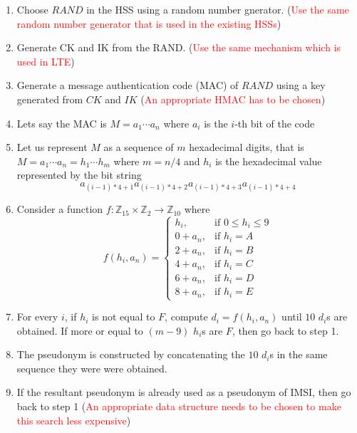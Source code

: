 \documentclass[12pt]{article}
\begin{document}
    \begin{enumerate}
    \item Choose $RAND$ in the HSS using a random number gnerator. (\textcolor{red}{Use the same random number generator that is used in the existing HSSs})
    \item Generate CK and IK from the RAND. (\textcolor{red}{Use the same mechanism which is used in LTE})
    \item Generate a message authentication code (MAC) of $RAND$ using a key generated from $CK$ and $IK$  (\textcolor{red}{An appropriate HMAC has to be chosen})
    \item Lets say the MAC is $M = a_1 \cdots a_n$ where $a_i$ is the $i$-th bit of the code
    \item Let us represent $M$ as a sequence of $m$ hexadecimal digits, that is $M = a_1 \cdots a_n = h_1 \cdots h_{m}$ where $m = n/4$ and $h_{i}$ is the hexadecimal value represented by the bit string $$a_{(i-1)*4+1}a_{(i-1)*4+2}a_{(i-1)*4+3}a_{(i-1)*4+4}$$ 
    \item Consider a function $f:\mathbb{Z}_{15} \times \mathbb{Z}_2 \rightarrow \mathbb{Z}_{10}$ where 
\[
    f(h_i,a_n)= 
\begin{cases}
    h_i,& \text{if } 0\leq h_i\leq 9\\
    0+a_n,              & \text{if } h_i = A\\
    2+a_n,              & \text{if } h_i = B\\
    4+a_n,              & \text{if } h_i = C\\
    6+a_n,              & \text{if } h_i = D\\
    8+a_n,              & \text{if } h_i = E
\end{cases}
\]
    \item For every $i$, if $h_i$ is not equal to $F$, compute $d_i = f(h_i,a_n)$ until $10$ $d_i$s are obtained. If more or equal to $(m-9)$ $h_i$s are $F$, then go  back to step 1.
    \item The pseudonym is constructed by concatenating the $10$ $d_i$s in the same sequence they were were obtained.
    \item If the resultant pseudonym is already used as a pseudonym of IMSI, then go back to step 1 (\textcolor{red}{An appropriate data structure needs to be chosen to make this search less expensive})
    \end{enumerate}
    
\end{document}
